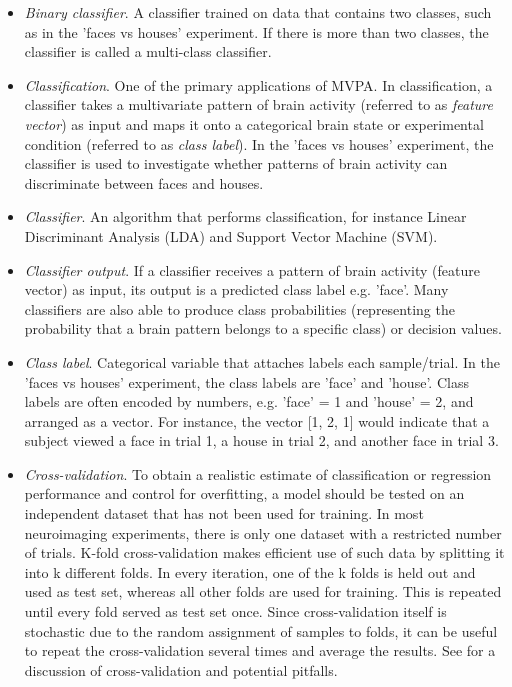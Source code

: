 \documentclass[utf8]{frontiersSCNS} %
\begin{document}
\begin{itemize}
\item \textit{Binary classifier}. A classifier trained on data that contains two classes, such as in the 'faces vs houses' experiment. If there is more than two classes, the classifier is called a multi-class classifier.
\item \textit{Classification}. One of the primary applications of MVPA. In classification, a classifier takes a multivariate pattern of brain activity (referred to as \textit{feature vector}) as input and maps it onto a categorical brain state or experimental condition (referred to as \textit{class label}). In the 'faces vs houses' experiment, the classifier is used to investigate whether patterns of brain activity  can discriminate between faces and houses.
\item \textit{Classifier}. An algorithm that performs classification, for instance Linear Discriminant Analysis (LDA) and Support Vector Machine (SVM).
\item \textit{Classifier output}. If a classifier receives a pattern of brain activity (feature vector) as input, its output is a predicted class label e.g. 'face'. Many classifiers are also able to produce class probabilities (representing the probability that a brain pattern belongs to a specific class) or decision values.
\item \textit{Class label}. Categorical variable that attaches labels each sample/trial. In the 'faces vs houses' experiment, the class labels are 'face' and 'house'. Class labels are often encoded by numbers, e.g. 'face' = 1 and 'house' = 2, and arranged as a vector. For instance, the vector [1, 2, 1] would indicate that a subject viewed a face in trial 1, a house in trial 2, and another face in trial 3.
\item \textit{Cross-validation}. To obtain a realistic estimate of classification or regression performance and control for overfitting, a model should be tested on an independent dataset that has not been used for training. In most neuroimaging experiments, there is only one dataset with a restricted number of trials. K-fold cross-validation makes efficient use of such data by splitting it into k different folds. In every iteration, one of the k folds is held out and used as test set, whereas all other folds are used for training. This is repeated until every fold served as test set once. Since cross-validation itself is stochastic due to the random assignment of samples to folds, it can be useful to repeat the cross-validation several times and average the results. See \cite{Lemm2011,Varoquaux2017} for a discussion of cross-validation and potential pitfalls.

\end{itemize}
\end{document}
